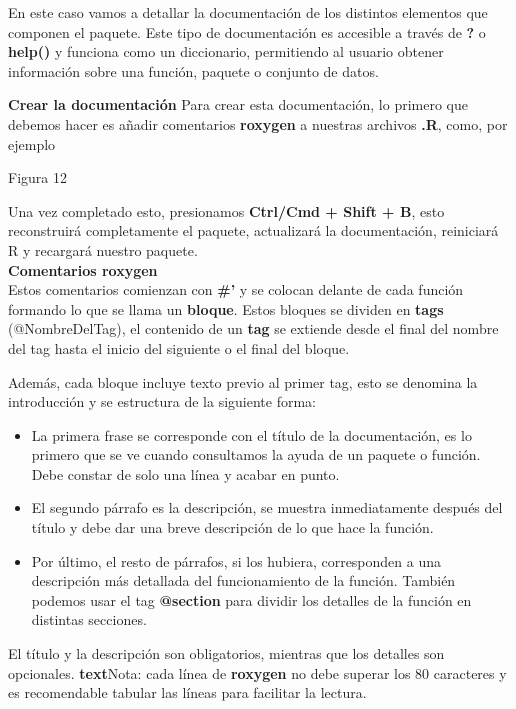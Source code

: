 En este caso vamos a detallar la documentaci\'on de los distintos elementos que componen el
paquete.
Este tipo de documentaci\'on es accesible a trav\'es de \textbf{?} o \textbf{help()} y funciona como un
diccionario, permitiendo al usuario obtener informaci\'on sobre una funci\'on, paquete o conjunto
de datos.

\textbf{Crear la documentaci\'on}
Para crear esta documentaci\'on, lo primero que debemos hacer es a\~nadir comentarios
\textbf{roxygen} a nuestras archivos \textbf{.R}, como, por ejemplo

Figura 12

Una vez completado esto, presionamos \textbf{Ctrl/Cmd + Shift + B}, esto reconstruir\'a
completamente el paquete, actualizar\'a la documentaci\'on, reiniciar\'a R y recargar\'a nuestro
paquete. \\

\textbf{Comentarios roxygen} \\
Estos comentarios comienzan con \textbf{\#'} y se colocan delante de cada funci\'on formando lo que
se llama un \textbf{bloque}. Estos bloques se dividen en \textbf{tags} (@NombreDelTag), el contenido de un
\textbf{tag} se extiende desde el final del nombre del tag hasta el inicio del siguiente o el final del
bloque.

Adem\'as, cada bloque incluye texto previo al primer tag, esto se denomina la introducci\'on y
se estructura de la siguiente forma:

\begin{itemize}
    \item La primera frase se corresponde con el t\'itulo de la documentaci\'on, es lo primero que
se ve cuando consultamos la ayuda de un paquete o funci\'on. Debe constar de solo
una l\'inea y acabar en punto.
    \item El segundo p\'arrafo es la descripci\'on, se muestra inmediatamente despu\'es del t\'itulo y
debe dar una breve descripci\'on de lo que hace la funci\'on.
    \item Por \'ultimo, el resto de p\'arrafos, si los hubiera, corresponden a una descripci\'on m\'as
detallada del funcionamiento de la funci\'on. Tambi\'en podemos usar el tag \textbf{@section}
para dividir los detalles de la funci\'on en distintas secciones.
\end{itemize}

El t\'itulo y la descripci\'on son obligatorios, mientras que los detalles son opcionales.
\textbf{text}{Nota}: cada l\'inea de \textbf{roxygen} no debe superar los 80 caracteres y es recomendable tabular
las l\'ineas para facilitar la lectura.

